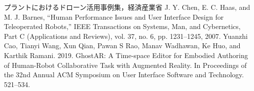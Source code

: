 \documentclass[a4paper,10pt,twocolumn,uplatex]{jsarticle}
\begin{document}
\footnotesize{
  \begin{thebibliography}{99}
     プラントにおけるドローン活用事例集，経済産業省
     J. Y. Chen, E. C. Haas, and M. J. Barnes, “Human Performance Issues
    and User Interface Design for Teleoperated Robots,” IEEE Transactions
    on Systems, Man, and Cybernetics, Part C (Applications and Reviews),
    vol. 37, no. 6, pp. 1231–1245, 2007.
     Yuanzhi Cao, Tianyi Wang, Xun Qian, Pawan S Rao,
    Manav Wadhawan, Ke Huo, and Karthik Ramani. 2019.
    GhostAR: A Time-space Editor for Embodied
    Authoring of Human-Robot Collaborative Task with
    Augmented Reality. In Proceedings of the 32nd Annual
    ACM Symposium on User Interface Software and
    Technology. 521–534. 
  \end{thebibliography}
}

\end{document}
